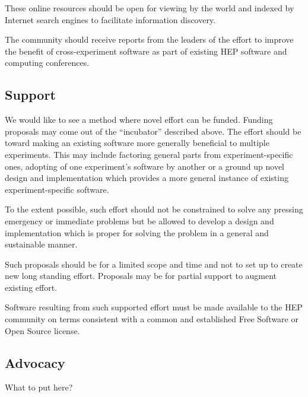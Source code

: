 \noindent These online resources should be open for viewing by the world and
indexed by Internet search engines to facilitate information
discovery.

The community should receive reports from the leaders of the effort to
improve the benefit of cross-experiment software as part of existing
HEP software and computing conferences.


\subsection{Support}

We would like to see a method where novel effort can be funded.
Funding proposals may come out of the ``incubator'' described above.
The effort should be toward making an existing software more generally
beneficial to multiple experiments.  This may include factoring
general parts from experiment-specific ones, adopting of one
experiment's software by another or a ground up novel design and
implementation which provides a more general instance of existing
experiment-specific software.

To the extent possible, such effort should not be constrained to solve
any pressing emergency or immediate problems but be allowed to develop
a design and implementation which is proper for solving the problem in
a general and sustainable manner.

Such proposals should be for a limited scope and time and not to set
up to create new long standing effort.  Proposals may be for partial
support to augment existing effort.

Software resulting from such supported effort must be made available
to the HEP community on terms consistent with a common and established
Free Software or Open Source license.

\subsection{Advocacy}

What to put here?

